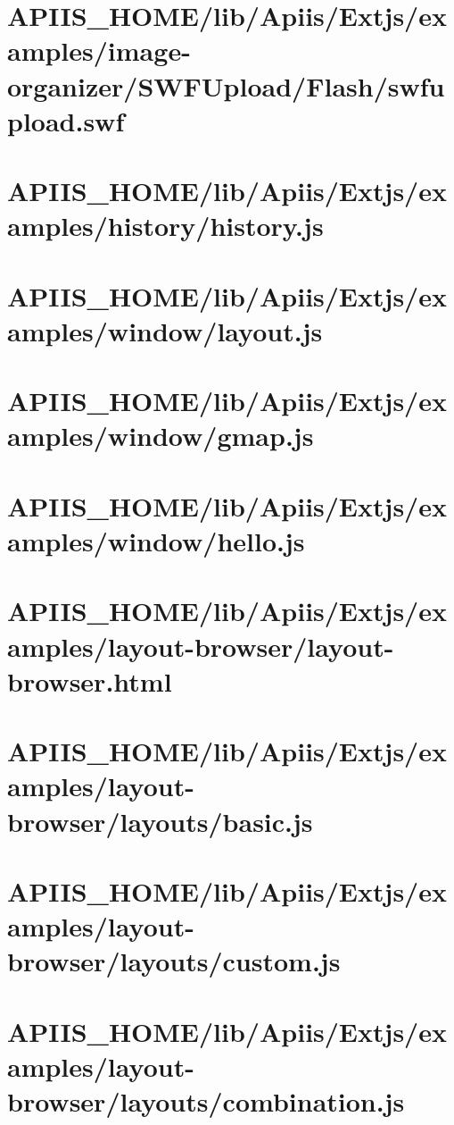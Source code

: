 \section{APIIS\_HOME/lib/Apiis/Extjs/examples/image-organizer/SWFUpload/Flash/swfupload.swf} 
\section{APIIS\_HOME/lib/Apiis/Extjs/examples/history/history.js} 
\section{APIIS\_HOME/lib/Apiis/Extjs/examples/window/layout.js} 
\section{APIIS\_HOME/lib/Apiis/Extjs/examples/window/gmap.js} 
\section{APIIS\_HOME/lib/Apiis/Extjs/examples/window/hello.js} 
\section{APIIS\_HOME/lib/Apiis/Extjs/examples/layout-browser/layout-browser.html} 
\section{APIIS\_HOME/lib/Apiis/Extjs/examples/layout-browser/layouts/basic.js} 
\section{APIIS\_HOME/lib/Apiis/Extjs/examples/layout-browser/layouts/custom.js} 
\section{APIIS\_HOME/lib/Apiis/Extjs/examples/layout-browser/layouts/combination.js} 
